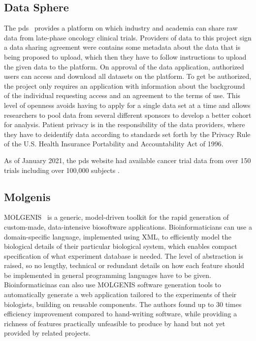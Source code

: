 \subsection*{Data Sphere}
The \gls{pds}~\cite{datasphere} provides a platform on which industry and academia can share
raw data from late-phase oncology clinical trials.
Providers of data to this project sign a data sharing agreement were contains some
metadata about the data that is being proposed to upload, which then they have to
follow instructions to upload the given data to the platform.
On approval of the data application, authorized users can access and download all
datasets on the platform.
To get be authorized, the project only requires an application with information about
the background of the individual requesting access and an agreement to the terms of
use.
This level of openness avoids having to apply for a single data set at a time and
allows researchers to pool data from several different sponsors to develop a better
cohort for analysis.
Patient privacy is in the responsibility of the data providers, where they have to
deidentify data according to standards set forth by the Privacy Rule of the U.S. Health
Insurance Portability and Accountability Act of 1996.

As of January 2021, the \gls{pds} website had available cancer trial data from over 150
trials including over 100,000 subjects \cite{datasphere-site}.

\subsection*{Molgenis}
MOLGENIS~\cite{molgenis} is a generic, model-driven toolkit for the rapid generation of custom-made,
data-intensive biosoftware applications.
Bioinformaticians can use a domain-specific language, implemented using XML, to
efficiently model the biological details of their particular biological system, which
enables compact specification of what experiment database is needed.
The level of abstraction is raised, so no lengthy, technical or redundant details on
how each feature should be implemented in general programming languages have to be
given.
Bioinformaticinas can also use MOLGENIS software generation tools to automatically
generate a web application tailored to the experiments of their biologists, building on
reusable components.
The authors found up to 30 times efficiency improvement compared to hand-writing
software, while providing a richness of features practically unfeasible to produce by
hand but not yet provided by related projects.

